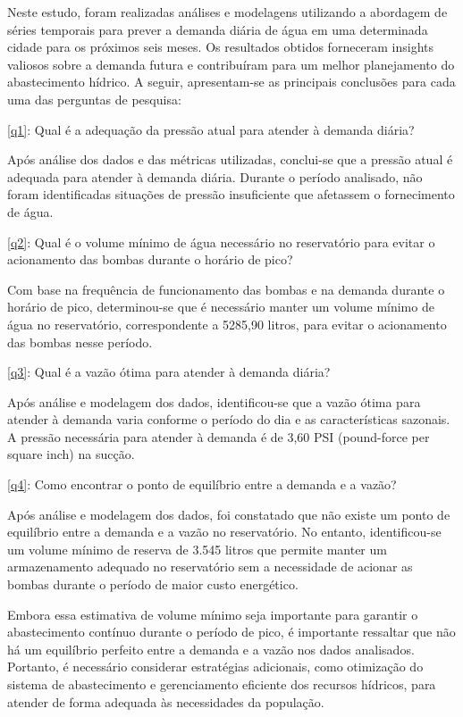 Neste estudo, foram realizadas análises e modelagens utilizando a abordagem de séries temporais para prever a demanda diária de água em uma determinada cidade para os próximos seis meses. Os resultados obtidos forneceram insights valiosos sobre a demanda futura e contribuíram para um melhor planejamento do abastecimento hídrico. A seguir, apresentam-se as principais conclusões para cada uma das perguntas de pesquisa:

\ref{q1}: Qual é a adequação da pressão atual para atender à demanda diária?

Após análise dos dados e das métricas utilizadas, conclui-se que a pressão atual é adequada para atender à demanda diária. Durante o período analisado, não foram identificadas situações de pressão insuficiente que afetassem o fornecimento de água.

\ref{q2}: Qual é o volume mínimo de água necessário no reservatório para evitar o acionamento das bombas durante o horário de pico?

Com base na frequência de funcionamento das bombas e na demanda durante o horário de pico, determinou-se que é necessário manter um volume mínimo de água no reservatório, correspondente a 5285,90 litros, para evitar o acionamento das bombas nesse período.

\ref{q3}: Qual é a vazão ótima para atender à demanda diária?

Após análise e modelagem dos dados, identificou-se que a vazão ótima para atender à demanda varia conforme o período do dia e as características sazonais. A pressão necessária para atender à demanda é de 3,60 PSI (pound-force per square inch) na sucção.

\ref{q4}: Como encontrar o ponto de equilíbrio entre a demanda e a vazão?

Após análise e modelagem dos dados, foi constatado que não existe um ponto de equilíbrio entre a demanda e a vazão no reservatório. No entanto, identificou-se um volume mínimo de reserva de 3.545 litros que permite manter um armazenamento adequado no reservatório sem a necessidade de acionar as bombas durante o período de maior custo energético.

Embora essa estimativa de volume mínimo seja importante para garantir o abastecimento contínuo durante o período de pico, é importante ressaltar que não há um equilíbrio perfeito entre a demanda e a vazão nos dados analisados. Portanto, é necessário considerar estratégias adicionais, como otimização do sistema de abastecimento e gerenciamento eficiente dos recursos hídricos, para atender de forma adequada às necessidades da população.

